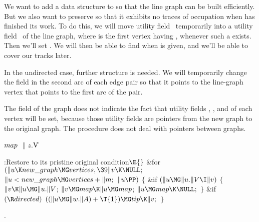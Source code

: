 We want to add a data structure to  so that the line graph can be
built efficiently. But we also want to preserve  so that it
exhibits no traces of occupation when  has finished its
work.  To do this, we will move utility field~ temporarily into
a utility field~ of the line graph, where  is the first
vertex having , whenever such a  exists. Then
we'll
set . We will then be able to find  when 
is given, and we'll be able to cover our tracks later.

In the undirected case, further structure is needed. We will temporarily
change the  field in the second arc of each edge pair so that
it points to the line-graph vertex that points to the first arc of the pair.

The  field of the graph does not indicate the fact that
utility
fields , , and  of each vertex will
be set, because those
utility fields are pointers from the new graph to the original graph.
The  procedure does not deal with pointers between graphs.

\Y\B\4\D$\\{map}$ \5
$\|z.{}$\|V\par
\Y\B\4:Restore  to its pristine original condition\X${}\E{}$\6
\&{for} ${}(\|u\K\\{new\_graph}\MG\\{vertices},\39\|v\K\NULL;{}$ ${}\|u<\\{new%
\_graph}\MG\\{vertices}+\|m;{}$ ${}\|u\PP){}$\5
${}\{{}$\1\6
\&{if} ${}(\|u\MG\|u.\|V\I\|v){}$\5
${}\{{}$\1\6
${}\|v\K\|u\MG\|u.\|V{}$;\6
${}\|v\MG\\{map}\K\|u\MG\\{map}{}$;\6
${}\|u\MG\\{map}\K\NULL;{}$\6
\4${}\}{}$\2\6
\&{if} ${}(\R\\{directed}){}$\1\5
${}((\|u\MG\|w.\|A)+\T{1})\MG\\{tip}\K\|v;{}$\2\6
\4${}\}{}$\2\par
{}.\fi

